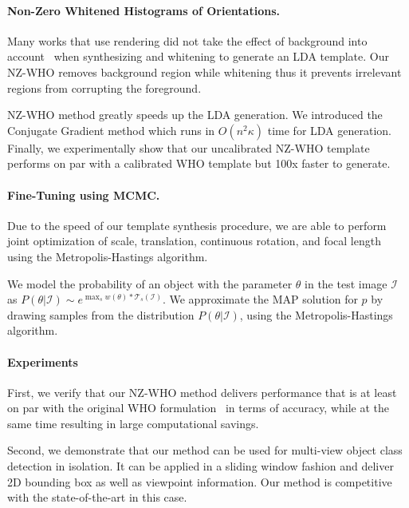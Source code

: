 \documentclass[extendedabs]{bmvc2k}
\begin{document}
\vspace{-0.1in}
\paragraph{Non-Zero Whitened Histograms of Orientations.} Many works that use
rendering did not take the effect of background into account~\cite{Aubry14}
when synthesizing and whitening to generate an LDA template. Our NZ-WHO removes
background region while whitening thus it prevents irrelevant regions from
corrupting the foreground.

NZ-WHO method greatly speeds up the LDA generation. We introduced the Conjugate
Gradient method which runs in $O(n^2\kappa)$ time for LDA generation. Finally,
we experimentally show that our uncalibrated NZ-WHO template performs on par
with a calibrated WHO template but 100x faster to generate.


\vspace{-0.1in}
\paragraph{Fine-Tuning using MCMC.} Due to the speed of our template synthesis
procedure, we are able to perform joint optimization of scale, translation,
continuous rotation, and focal length using the Metropolis-Hastings algorithm.

We model the probability of an object with the parameter $\theta$ in the test
image $\mathcal{I}$ as $P(\theta| \mathcal{I}) \sim e^{ \max_{s} w(\theta)
	\ast \mathcal{T}_s(\mathcal{I})}$. We approximate the MAP solution for $p$ by
drawing samples from the distribution $P(\theta | \mathcal{I})$, using the
Metropolis-Hastings algorithm.

\vspace{-0.1in}
\paragraph{Experiments} First, we verify that our NZ-WHO method delivers
performance that is at least on par with the original WHO
formulation~\cite{Hariharan12} in terms of accuracy, while at the same time
resulting in large computational savings.

Second, we demonstrate that our method can be used for multi-view
object class detection in isolation. It can be applied in a sliding
window fashion and deliver 2D bounding box as well as viewpoint
information. Our method is competitive with the state-of-the-art in this
case.
\end{document}
